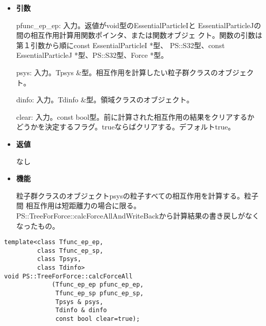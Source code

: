 \begin{itemize}

\item {\bf 引数}

pfunc\_ep\_ep: 入力。返値がvoid型のEssentialParticleIと
EssentialParticleJの間の相互作用計算用関数ポインタ、または関数オブジェ
クト。関数の引数は第１引数から順にconst EssentialParticleI *型、
PS::S32型、const EssentialParticleJ *型、PS::S32型、Force *型。

psys: 入力。Tpsys \&型。相互作用を計算したい粒子群クラスのオブジェクト。

dinfo: 入力。Tdinfo \&型。領域クラスのオブジェクト。

clear: 入力。const bool型。前に計算された相互作用の結果をクリアするか
どうかを決定するフラグ。trueならばクリアする。デフォルトtrue。

\item {\bf 返値}

なし

\item {\bf 機能}

粒子群クラスのオブジェクトpsysの粒子すべての相互作用を計算する。粒子間
相互作用は短距離力の場合に限る。
PS::TreeForForce::calcForceAllAndWriteBackから計算結果の書き戻しがなく
なったもの。

\end{itemize}

\begin{screen}
\begin{verbatim}
template<class Tfunc_ep_ep,
         class Tfunc_ep_sp,
         class Tpsys,
         class Tdinfo>
void PS::TreeForForce::calcForceAll
             (Tfunc_ep_ep pfunc_ep_ep,
              Tfunc_ep_sp pfunc_ep_sp,
              Tpsys & psys,
              Tdinfo & dinfo
              const bool clear=true);
\end{verbatim}
\end{screen}

